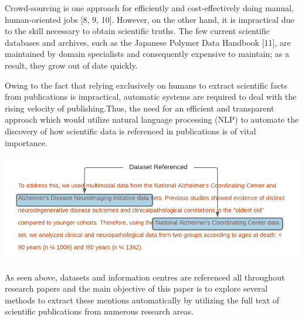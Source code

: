 \documentclass[twocolumn]{article}
\begin{document}
Crowd-sourcing is one approach for efficiently and cost-effectively doing manual, human-oriented jobs [8, 9, 10]. However, on the other hand, it is impractical due to the skill necessary to obtain scientific truths. The few current scientific databases and archives, such as the Japanese Polymer Data Handbook [11], are maintained by domain specialists and consequently expensive to maintain; as a result, they grow out of date quickly.\par

Owing to the fact that relying exclusively on humans to extract scientific facts from publications is impractical, automatic systems are required to deal with the rising velocity of publishing.Thus, the need for an efficient and transparent approach which would utilize natural language processing (NLP) to automate the discovery of how scientific data is referenced in publications is of vital importance.\par


\begin{center}
\hspace*{-0.8cm}
\includegraphics[scale=0.6]{Dataset Referenced.png}
\end{center}

As seen above, datasets and information centres are referenced all throughout research papers and the main objective of this paper is to explore several methods to extract these mentions automatically by utilizing the full text of scientific publications from numerous research areas. \par
	
\end{document}
